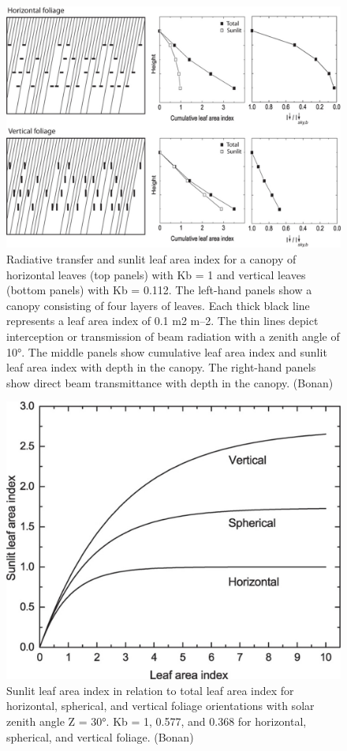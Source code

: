 \documentclass[12pt,oneside]{book}
\begin{document}
\begin{figure}

{\centering \includegraphics[width=0.8\linewidth]{figures/chap3/f313_sun_shade} 

}

\caption{Radiative transfer and sunlit leaf area index for a canopy of horizontal leaves (top panels) with Kb = 1 and vertical leaves (bottom panels) with Kb = 0.112. The left-hand panels show a canopy consisting of four layers of leaves. Each thick black line represents a leaf area index of 0.1 m2 m–2. The thin lines depict interception or transmission of beam radiation with a zenith angle of 10°. The middle panels show cumulative leaf area index and sunlit leaf area index with depth in the canopy. The right-hand panels show direct beam transmittance with depth in the canopy. (Bonan)}\label{fig:f313}
\end{figure}

\begin{figure}

{\centering \includegraphics[width=0.8\linewidth]{figures/chap3/f314_sunlit} 

}

\caption{Sunlit leaf area index in relation to total leaf area index for horizontal, spherical, and vertical foliage orientations with solar zenith angle Ζ = 30°. Kb = 1, 0.577, and 0.368 for horizontal, spherical, and vertical foliage. (Bonan)}\label{fig:f314}
\end{figure}
\end{document}
